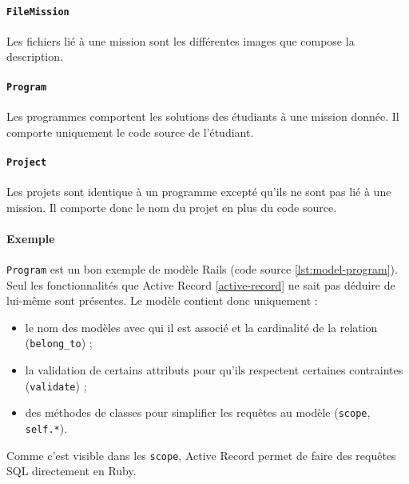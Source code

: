 \paragraph{\texttt{FileMission}} Les fichiers lié à une mission sont les différentes images que compose la description. %
\paragraph{\texttt{Program}} Les programmes comportent les solutions des étudiants à une mission donnée. Il comporte uniquement le code source de l'étudiant.
\paragraph{\texttt{Project}} Les projets sont identique à un programme excepté qu'ils ne sont pas lié à une mission. Il comporte donc le nom du projet en plus du code source.

\paragraph{Exemple} \texttt{Program} est un bon exemple de modèle Rails (code source \ref{lst:model-program}). Seul les fonctionnalités que Active Record \ref{active-record} ne sait pas déduire de lui-même sont présentes. Le modèle contient donc uniquement :
\begin{itemize}
  \item le nom des modèles avec qui il est associé et la cardinalité de la relation (\texttt{belong\_to}) ;
  \item la validation de certains attributs pour qu'ils respectent certaines contraintes (\texttt{validate}) ;
  \item des méthodes de classes pour simplifier les requêtes au modèle (\texttt{scope}, \texttt{self.*}).
\end{itemize}

Comme c'est visible dans les \texttt{scope}, Active Record permet de faire des requêtes SQL directement en Ruby. 



